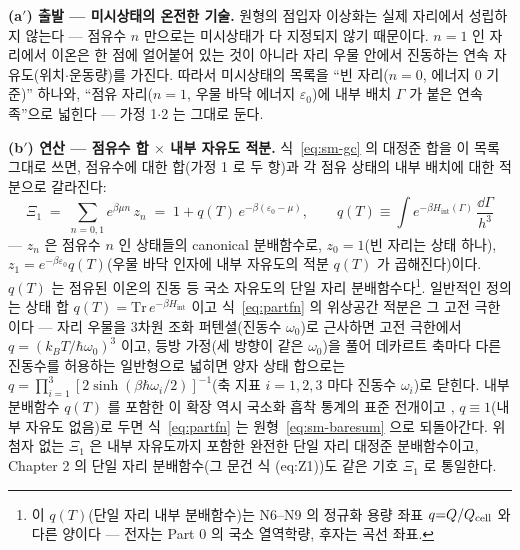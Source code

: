 \textbf{(a$'$) 출발 --- 미시상태의 온전한 기술.} 원형의 점입자 이상화는 실제 자리에서 성립하지 않는다 ---
점유수 $n$ 만으로는 미시상태가 다 지정되지 않기 때문이다. $n=1$ 인 자리에서 이온은 한 점에 얼어붙어
있는 것이 아니라 자리 우물 안에서 진동하는 연속 자유도(위치$\cdot$운동량)를 가진다. 따라서 미시상태의
목록을 ``빈 자리($n=0$, 에너지 $0$ 기준)'' 하나와, ``점유 자리($n=1$, 우물 바닥 에너지
$\varepsilon_0$)에 내부 배치 $\Gamma$ 가 붙은 연속족''으로 넓힌다 --- 가정 1$\cdot$2 는 그대로 둔다.

\textbf{(b$'$) 연산 --- 점유수 합 $\times$ 내부 자유도 적분.} 식~\eqref{eq:sm-gc} 의 대정준 합을 이 목록
그대로 쓰면, 점유수에 대한 합(가정 1 로 두 항)과 각 점유 상태의 내부 배치에 대한 적분으로 갈라진다:
\begin{equation}
\Xi_1\;=\;\sum_{n=0,1}e^{\beta\mu n}\,z_n
\;=\;1+q(T)\,e^{-\beta(\varepsilon_0-\mu)},
\qquad
q(T)\equiv\int e^{-\beta H_\mathrm{int}(\Gamma)}\,\frac{\dd\Gamma}{h^3}
\label{eq:partfn}
\end{equation}
--- $z_n$ 은 점유수 $n$ 인 상태들의 canonical 분배함수로, $z_0=1$(빈 자리는 상태 하나),
$z_1=e^{-\beta\varepsilon_0}q(T)$(우물 바닥 인자에 내부 자유도의 적분 $q(T)$ 가 곱해진다)이다.
$q(T)$ 는 점유된 이온의 진동 등 국소 자유도의 단일 자리 분배함수다\footnote{이 $q(T)$(단일 자리 내부 분배함수)는 N6--N9 의 정규화 용량 좌표 $q{=}Q/Q_{\mathrm{cell}}$ 와 다른 양이다 --- 전자는 Part 0 의 국소 열역학량, 후자는 곡선 좌표.}. 일반적인 정의는 상태
합 $q(T)=\mathrm{Tr}\,e^{-\beta H_\mathrm{int}}$ 이고 식~\eqref{eq:partfn} 의 위상공간 적분은 그 고전
극한이다 --- 자리 우물을 3차원 조화 퍼텐셜(진동수 $\omega_0$)로 근사하면 고전 극한에서
$q=(k_BT/\hbar\omega_0)^3$ 이고, 등방 가정(세 방향이 같은 $\omega_0$)을 풀어 데카르트 축마다 다른
진동수를 허용하는 일반형으로 넓히면 양자 상태 합으로는
$q=\prod_{i=1}^{3}[2\sinh(\beta\hbar\omega_i/2)]^{-1}$(축 지표 $i=1,2,3$ 마다 진동수 $\omega_i$)로 닫힌다.
내부 분배함수 $q(T)$ 를 포함한 이 확장 역시 국소화 흡착 통계의 표준 전개이고
\cite{hill1960,fowler1939,mcquarrie1976}, $q\equiv1$(내부 자유도 없음)로 두면
식~\eqref{eq:partfn} 는 원형~\eqref{eq:sm-baresum} 으로 되돌아간다. 위 첨자 없는 $\Xi_1$ 은 내부
자유도까지 포함한 완전한 단일 자리 대정준 분배함수이고, Chapter 2 의 단일 자리 분배함수(그 문건 식
(eq:Z1))도 같은 기호 $\Xi_1$ 로 통일한다.

